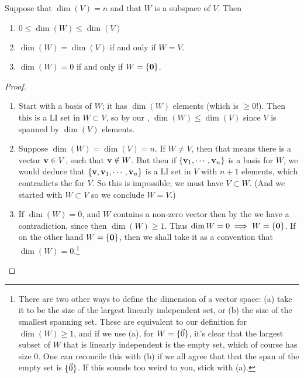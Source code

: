 \begin{theorem} \label{dimsubspaces}
 Suppose that $\dim(V) = n$ and that 
$W$ is a subspace of $V$.  Then
\begin{enumerate}
\item $0 \leq \dim(W) \leq \dim(V)$
\item $\dim(W) = \dim(V)$ if and only if $W=V$.
\item $\dim(W)=0$ if and only if $W = \{\mathbf{0}\}$.
\end{enumerate}
\end{theorem}

\begin{proof}~
\begin{enumerate}
\item Start with a basis of $W$; it has $\dim(W)$ elements (which is $\geq 0$!).  
Then this is a LI set in $W \subset V$, so by our , 
$\dim(W) \leq \dim(V)$
since $V$ is spanned by $\dim(V)$ elements.

\item Suppose $\dim(W) = \dim(V)=n$.  If $W\neq V$,
then that means there is a vector $\mathbf{v} \in V$, such that $\mathbf{v} \notin W$.
But then if $\{\mathbf{v}_1,\cdots,\mathbf{v}_n\}$ is a basis for $W$, 
we would deduce that $\{\mathbf{v}, \mathbf{v}_1,\cdots,\mathbf{v}_n\}$ is a LI set in $V$
with $n+1$ elements, which contradicts the  for $V$.
So this is impossible; we must have $V\subset W$.  (And we started with
$W \subset V$ so we conclude $W=V$.)

\item If $\dim (W)=0$, and $W$ contains a non-zero vector  then by the  we have a contradiction, since then $\dim (W) \ge 1$. Thus $\dim W=0 \implies W=\{\mathbf{0} \}$. If on the other hand $W=\{\mathbf{0} \}$, then we shall take it as a convention that $\dim(W)=0$.\footnote{There are two other ways to define the dimension of a vector space: (a) take it to be the size of the largest linearly independent set, or (b) the size of the smallest spanning set. These are equivalent to our definition for $\dim(W)\ge 1$, and if we use (a), for $W=\{\vec 0 \}$, it's clear that the largest subset of $W$ that is linearly independent is the empty set, which of course has size $0$. One can reconcile this with (b) if we all agree that that the span of the empty set is $\{\vec0 \}$. If this sounds too weird to you, stick with (a).}
\end{enumerate}
\end{proof}

